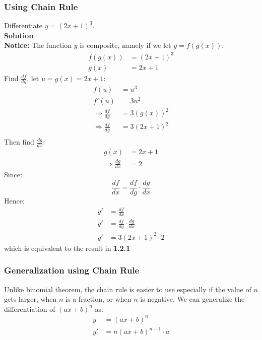 \documentclass[hidelinks, a4paper, 12pt]{article}
\newcommand{\bd}{\textbf}
\newcommand{\n}{\\[\baselineskip]}
\newcommand{\thus}{\Rightarrow}
\begin{document}
            \subsubsection{Using Chain Rule}
                Differentiate $y=(2x+1)^3$.\n
                \bd{Solution}\n
                \bd{Notice:} The function $y$ is composite, namely if we let $y = f(g(x))$:
                \[\begin{split}
                    f(g(x)) &= (2x+1)^3\\
                    g(x) &= 2x + 1
                \end{split}\]
                Find $\frac{df}{dg}$, let $u = g(x) = 2x+1$:
                \[\begin{split}
                    f(u) &= u^3\\
                    f'(u) &= 3u^2\\
                    \thus \frac{df}{dg} &= 3(g(x))^2\\
                    \thus \frac{df}{dg} &= 3(2x+1)^2\\
                \end{split}\]
                Then find $\frac{dg}{dx}$:
                \[\begin{split}
                    g(x) &= 2x+1\\
                    \thus \frac{dg}{dx} &= 2
                \end{split}\]
                Since:
                \[\frac{df}{dx} = \frac{df}{dg} \cdot \frac{dg}{dx}\]
                Hence:
                \[\begin{split}
                    y' &= \frac{df}{dx}\\
                    y' &= \frac{df}{dg} \cdot \frac{dg}{dx}\\
                    y' &= 3(2x+1)^2 \cdot 2
                \end{split}\]
                which is equivalent to the result in \bd{1.2.1}
            \subsubsection{Generalization using Chain Rule}
                Unlike binomial theorem, the chain rule is easier to use especially if the value of $n$ gets larger, when $n$ is a fraction, or when $n$ is negative. 
                We can generalize the differentiation of $(ax+b)^n$ as:
                \[\begin{split}
                    y &= (ax+b)^n\\
                    y' &= n(ax+b)^{n-1}\cdot a
                \end{split}\]
\end{document}
